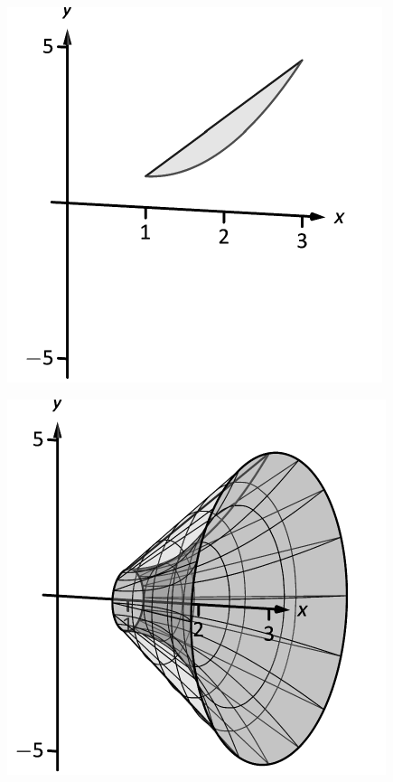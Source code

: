 \documentclass[10pt]{article}
\begin{document}
\includegraphics{figwash1_3DBW.pdf}
\texttt{}

\includegraphics{figwash1b_3DBW.pdf}
\texttt{}
\end{document}
